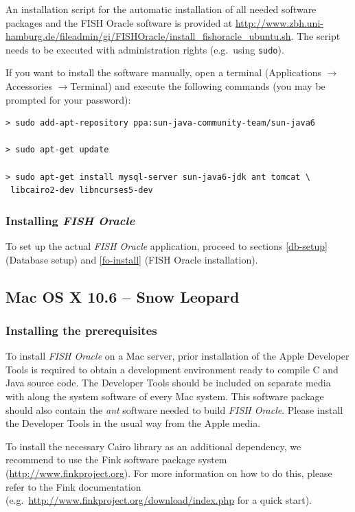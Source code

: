 \documentclass[11pt,final]{article}
\newcommand{\FO}[0]{\emph{FISH Oracle}\xspace}
\begin{document}
An installation script for the automatic installation of all needed software
packages and the FISH Oracle software is provided at
\url{http://www.zbh.uni-hamburg.de/fileadmin/gi/FISHOracle/install_fishoracle_ubuntu.sh}.
The script needs to be executed with administration rights (e.g.\ using
\texttt{sudo}).

If you want to install the software manually, open a terminal
(Applications $\rightarrow$ Accessories $\rightarrow$Terminal)
and execute the following commands (you may be prompted for your password):

\begin{lstlisting}
> sudo add-apt-repository ppa:sun-java-community-team/sun-java6

> sudo apt-get update

> sudo apt-get install mysql-server sun-java6-jdk ant tomcat \
 libcairo2-dev libncurses5-dev
\end{lstlisting}

\subsubsection*{Installing \FO}

To set up the actual \FO application, proceed to sections \ref{db-setup}
(Database setup) and \ref{fo-install} (FISH Oracle installation).

\subsection{Mac OS X 10.6 -- Snow Leopard}
\label{macosx}

\subsubsection*{Installing the prerequisites}

To install \FO on a Mac server, prior installation of the Apple Developer
Tools is required to obtain a development environment ready to compile C and
Java source code. The Developer Tools should be included on separate media with
along the system software of every Mac system. This software package should
also contain the \emph{ant} software needed to build \FO. Please install the
Developer Tools in the usual way from the Apple media.

To install the necessary Cairo library as an additional dependency,
we recommend to use the Fink software package system
(\url{http://www.finkproject.org}).
For more information on how to do this, please refer to the Fink documentation
(e.g.\ \url{http://www.finkproject.org/download/index.php} for a quick start).
\end{document}
